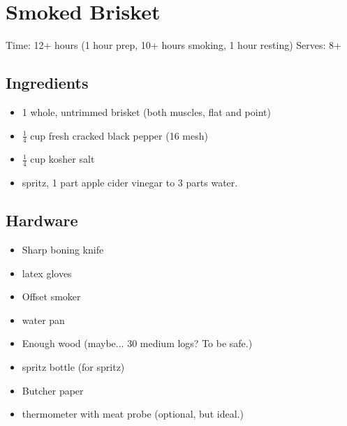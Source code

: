 \section{Smoked Brisket}
\label{smokedBrisket}
\setcounter{secnumdepth}{0}
Time: 12+ hours (1 hour prep, 10+ hours smoking, 1 hour resting)
Serves: 8+

\begin{multicols}{2}
\subsection*{Ingredients}
\begin{itemize}
    \item 1 whole, untrimmed brisket (both muscles, flat and point)
    \item \( \frac{1}{4} \) cup fresh cracked black pepper (16 mesh)
    \item \( \frac{1}{4} \) cup kosher salt
    \item spritz, 1 part apple cider vinegar to 3 parts water.
\end{itemize}

\subsection*{Hardware}
\begin{itemize}
    \item Sharp boning knife
    \item latex gloves
    \item Offset smoker
    \item water pan
    \item Enough wood (maybe... 30 medium logs? To be safe.)
    \item spritz bottle (for spritz)
    \item Butcher paper
    \item thermometer with meat probe (optional, but ideal.)
\end{itemize}
\clearpage


\end{multicols}
